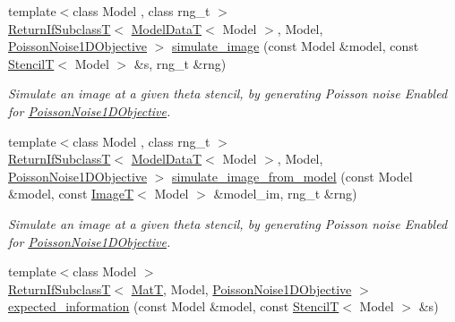 \begin{DoxyCompactItemize}
\item 
{\footnotesize template$<$class Model , class rng\+\_\+t $>$ }\\\hyperlink{namespacemappel_a3b77d227658ba3ba9e16fea6fa6e626d}{Return\+If\+SubclassT}$<$ \hyperlink{namespacemappel_a97f050df953605381ae9c901c3b125f1}{Model\+DataT}$<$ Model $>$, Model, \hyperlink{classmappel_1_1PoissonNoise1DObjective}{Poisson\+Noise1\+D\+Objective} $>$ \hyperlink{namespacemappel_1_1methods_abe1122f5c810f1b41c391a7e724fd74d}{simulate\+\_\+image} (const Model \&model, const \hyperlink{namespacemappel_a3a06598240007876f8c4bf834ad86197}{StencilT}$<$ Model $>$ \&s, rng\+\_\+t \&rng)
\begin{DoxyCompactList}\small\item\em Simulate an image at a given theta stencil, by generating Poisson noise Enabled for \hyperlink{classmappel_1_1PoissonNoise1DObjective}{Poisson\+Noise1\+D\+Objective}. \end{DoxyCompactList}\item 
{\footnotesize template$<$class Model , class rng\+\_\+t $>$ }\\\hyperlink{namespacemappel_a3b77d227658ba3ba9e16fea6fa6e626d}{Return\+If\+SubclassT}$<$ \hyperlink{namespacemappel_a97f050df953605381ae9c901c3b125f1}{Model\+DataT}$<$ Model $>$, Model, \hyperlink{classmappel_1_1PoissonNoise1DObjective}{Poisson\+Noise1\+D\+Objective} $>$ \hyperlink{namespacemappel_1_1methods_a4a6ea9893f28e1f5c2604d8c3e7b6852}{simulate\+\_\+image\+\_\+from\+\_\+model} (const Model \&model, const \hyperlink{namespacemappel_a14658186b77757f3c35a69cb1be6cf4b}{ImageT}$<$ Model $>$ \&model\+\_\+im, rng\+\_\+t \&rng)
\begin{DoxyCompactList}\small\item\em Simulate an image at a given theta stencil, by generating Poisson noise Enabled for \hyperlink{classmappel_1_1PoissonNoise1DObjective}{Poisson\+Noise1\+D\+Objective}. \end{DoxyCompactList}\item 
{\footnotesize template$<$class Model $>$ }\\\hyperlink{namespacemappel_a3b77d227658ba3ba9e16fea6fa6e626d}{Return\+If\+SubclassT}$<$ \hyperlink{namespacemappel_a7091ab87c528041f7e2027195fad8915}{MatT}, Model, \hyperlink{classmappel_1_1PoissonNoise1DObjective}{Poisson\+Noise1\+D\+Objective} $>$ \hyperlink{namespacemappel_1_1methods_a07072e1c0c19cbffa6878362056f5758}{expected\+\_\+information} (const Model \&model, const \hyperlink{namespacemappel_a3a06598240007876f8c4bf834ad86197}{StencilT}$<$ Model $>$ \&s)

\end{DoxyCompactItemize}
